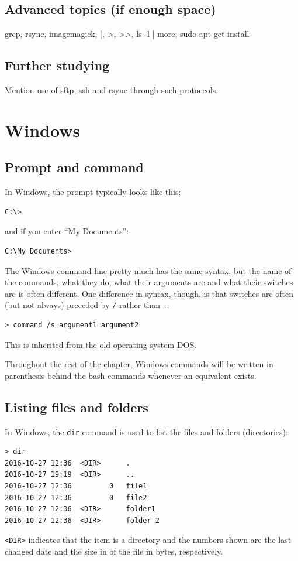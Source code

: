 \subsection{Advanced topics (if enough space)}
grep, rsync, imagemagick, |, >, >>, ls -l | more, sudo apt-get install

\subsection{Further studying}
Mention use of sftp, ssh and rsync through such protoccols. 

\section{Windows}

\subsection{Prompt and command}

In Windows, the prompt typically looks like this:
\begin{verbatim}
C:\>
\end{verbatim}
and if you enter ``My Documents'':
\begin{verbatim}
C:\My Documents>
\end{verbatim}

The Windows command line pretty much has the same syntax, but the name of the commands, what they do, what their arguments are and what their switches are is often different. One difference in syntax, though, is that switches are often (but not always) preceded by \verb$/$ rather than \verb|-|:

\begin{verbatim}
> command /s argument1 argument2
\end{verbatim}
This is inherited from the old operating system DOS.

Throughout the rest of the chapter, Windows commands will be written in parenthesis behind the bash commands whenever an equivalent exists.


\subsection{Listing files and folders}
In Windows, the \verb|dir| command is used to list the files and folders (directories):

\begin{Verbatim}[commandchars=\\\{\}]
> dir
2016-10-27 12:36  <DIR>      .
2016-10-27 19:19  <DIR>      ..
2016-10-27 12:36         0   file1
2016-10-27 12:36         0   file2
2016-10-27 12:36  <DIR>      folder1
2016-10-27 12:36  <DIR>      folder 2
\end{Verbatim}
\verb|<DIR>| indicates that the item is a directory and the numbers shown are the last changed date and the size in of the file in bytes, respectively.

